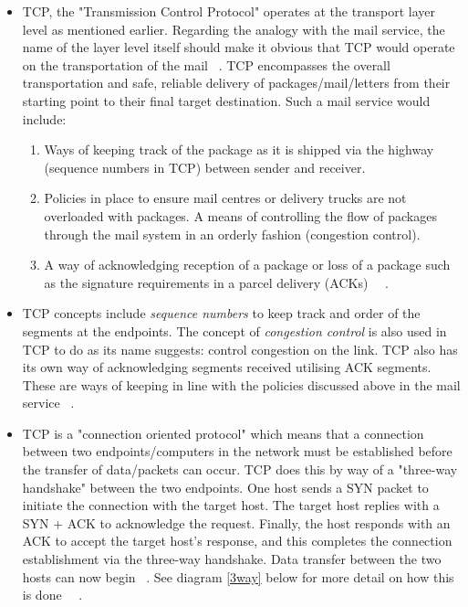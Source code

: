 \begin{itemize}
\item TCP, the "Transmission Control Protocol" operates at the transport layer level as mentioned earlier. Regarding the analogy with the mail service, the name of the layer level itself should make it obvious that TCP would operate on the transportation of the mail ~\cite{2}. TCP encompasses the overall transportation and safe, reliable delivery of packages/mail/letters from their starting point to their final target destination. Such a mail service would include:\\
\begin{enumerate}
\item Ways of keeping track of the package as it is shipped via the highway (sequence numbers in TCP) between sender and receiver.
\item Policies in place to ensure mail centres or delivery trucks are not overloaded with packages. A means of controlling the flow of packages through the mail system in an orderly fashion (congestion control).
\item A way of acknowledging reception of a package or loss of a package such as the signature requirements in a parcel delivery (ACKs) ~\cite{1}~\cite{2}.\\
\end{enumerate}

\item TCP concepts include \emph{sequence numbers} to keep track and order of the segments at the endpoints. The concept of \emph{congestion control} is also used in TCP to do as its name suggests: control congestion on the link. TCP also has its own way of acknowledging segments received utilising ACK segments. These are ways of keeping in line with the policies discussed above in the mail service ~\cite{1}.\\

\item TCP is a "connection oriented protocol" which means that a connection between two endpoints/computers in the network must be established before the transfer of data/packets can occur. TCP does this by way of a "three-way handshake" between the two endpoints. One host sends a SYN packet to initiate the connection with the target host. The target host replies with a SYN + ACK to acknowledge the request. Finally, the host responds with an ACK to accept the target host's response, and this completes the connection establishment via the three-way handshake. Data transfer between the two hosts can now begin ~\cite{1}. See diagram \ref{3way} below for more detail on how this is done ~\cite{1}~\cite{2}.  \\


\end{itemize}
